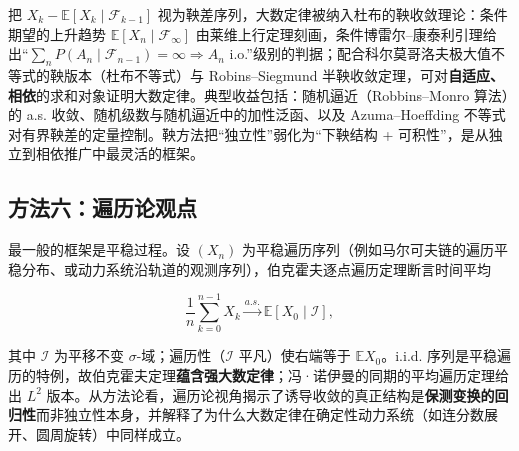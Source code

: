 把 $X_k - \mathbb{E}[X_k \mid \mathcal{F}_{k-1}]$ 视为鞅差序列，大数定律被纳入杜布的鞅收敛理论：条件期望的上升趋势 $\mathbb{E}[X_n \mid \mathcal{F}_\infty]$ 由莱维上行定理刻画，条件博雷尔--康泰利引理给出“$\sum_n P(A_n \mid \mathcal{F}_{n-1}) = \infty \Rightarrow A_n$ i.o.”级别的判据；配合科尔莫哥洛夫极大值不等式的鞅版本（杜布不等式）与 Robins--Siegmund 半鞅收敛定理，可对\textbf{自适应、相依}的求和对象证明大数定律。典型收益包括：随机逼近（Robbins--Monro 算法）的 a.s. 收敛、随机级数与随机逼近中的加性泛函、以及 Azuma--Hoeffding 不等式对有界鞅差的定量控制。鞅方法把“独立性”弱化为“下鞅结构 + 可积性”，是从独立到相依推广中最灵活的框架。

\subsection{方法六：遍历论观点}

最一般的框架是平稳过程。设 $(X_n)$ 为平稳遍历序列（例如马尔可夫链的遍历平稳分布、或动力系统沿轨道的观测序列），伯克霍夫逐点遍历定理\cite{birkhoff1931}断言时间平均

\begin{equation}
    \frac{1}{n}\sum_{k=0}^{n-1} X_k \xrightarrow{a.s.} \mathbb{E}[X_0 \mid \mathcal{I}],
\end{equation}

其中 $\mathcal{I}$ 为平移不变 $\sigma$-域；遍历性（$\mathcal{I}$ 平凡）使右端等于 $\mathbb{E}X_0$。i.i.d. 序列是平稳遍历的特例，故伯克霍夫定理\textbf{蕴含强大数定律}；冯·诺伊曼的同期的平均遍历定理\cite{vonneumann1932}给出 $L^2$ 版本。从方法论看，遍历论视角揭示了诱导收敛的真正结构是\textbf{保测变换的回归性}而非独立性本身，并解释了为什么大数定律在确定性动力系统（如连分数展开、圆周旋转）中同样成立。
